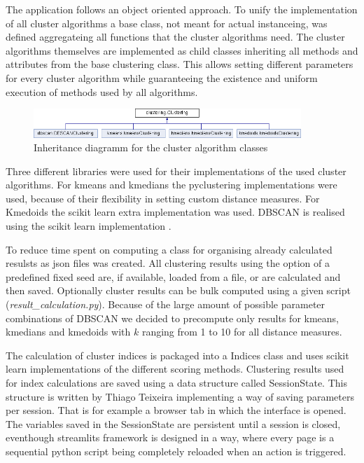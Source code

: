 The application follows an object oriented approach. To unify the implementation of all cluster algorithms a base class, not meant for actual instanceing, was defined aggregateing all functions that the cluster algorithms need.
The cluster algorithms themselves are implemented as child classes inheriting all methods and attributes from the base clustering class. This allows setting different parameters for every cluster algorithm while guaranteeing the existence and uniform execution of methods used by all algorithms.

\begin{figure}[H]
    \centering
    \includegraphics[width=0.9\textwidth]{../docs/html/classclustering_1_1Clustering}
    \caption{Inheritance diagramm for the cluster algorithm classes}
\end{figure}

Three different libraries were used for their implementations of the used cluster algorithms. 
For kmeans and kmedians the pyclustering \cite{Novikov2019} implementations were used, because of their flexibility in setting custom distance measures. For Kmedoids the scikit learn extra \cite{scikit-learn-extra} implementation was used.
DBSCAN is realised using the scikit learn implementation \cite{scikitlearn}.

To reduce time spent on computing a class for organising already calculated resulsts as json files was created. All clustering results using the option of a predefined fixed seed are, if available, loaded from a file, or are calculated and then saved. Optionally cluster results can be bulk computed using a given script (\textit{result\_calculation.py}). Because of the large amount of possible parameter combinations of DBSCAN we decided to precompute only results for kmeans, kmedians and kmedoids with $k$ ranging from 1 to 10 for all distance measures.

The calculation of cluster indices is packaged into a Indices class and uses scikit learn implementations of the different scoring methods. Clustering results used for index calculations are saved using a data structure called SessionState. This structure is written by Thiago Teixeira \cite{sessionstate} implementing a way of saving parameters per session. That is for example a browser tab in which the interface is opened. The variables saved in the SessionState are persistent until a session is closed, eventhough streamlits framework is designed in a way, where every page is a sequential python script being completely reloaded when an action is triggered. 

